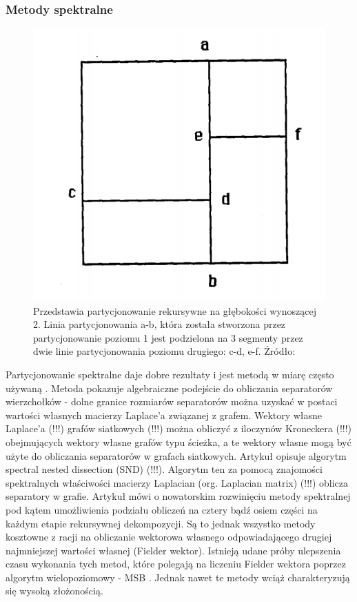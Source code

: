 \subsubsection{Metody spektralne}
\begin{figure}
    \vspace{-4mm}
    \includegraphics[width=\linewidth]{images/recursive}
    \caption{Przedstawia partycjonowanie rekursywne na głębokości wynoszącej 2. Linia partycjonowania a-b, która została stworzona
    przez partycjonowanie poziomu 1 jest podzielona na 3 segmenty przez dwie linie partycjonowania poziomu drugiego:
    c-d, e-f. Źródło: \cite{recursive}}
    \label{im:recursive_partitioning}
\end{figure}
Partycjonowanie spektralne daje dobre rezultaty i jest metodą w miarę często używaną
\cite{10.1137/0611030, 10.5555/147877.147902, improved_spectral}.
Metoda \cite{10.1137/0611030} pokazuje algebraiczne podejście do obliczania separatorów wierzchołków - dolne granice
rozmiarów separatorów można uzyskać w postaci wartości własnych macierzy Laplace'a związanej z grafem.
Wektory własne Laplace'a (!!!) grafów siatkowych (!!!) można obliczyć z iloczynów Kroneckera (!!!) obejmujących wektory własne grafów typu
ścieżka, a te wektory własne mogą być użyte do obliczania separatorów w grafach siatkowych.
Artykuł \cite{10.5555/147877.147902} opisuje algorytm spectral nested dissection (SND) (!!!).
Algorytm ten za pomocą znajomości spektralnych właściwości macierzy Laplacian (org. Laplacian matrix) (!!!) oblicza separatory w grafie.
Artykuł \cite{improved_spectral} mówi o nowatorskim rozwinięciu metody spektralnej pod kątem umożliwienia podziału
obliczeń na cztery bądź osiem części na każdym etapie rekursywnej dekompozycji.
Są to jednak wszystko metody kosztowne z racji na
obliczanie wektorowa własnego odpowiadającego drugiej najmniejszej wartości własnej (Fielder wektor).
Istnieją udane próby ulepszenia czasu wykonania tych metod, które polegają na liczeniu Fielder wektora poprzez
algorytm wielopoziomowy - MSB \cite{fast_multilevel}. Jednak nawet te metody wciąż charakteryzują się wysoką złożonością.

